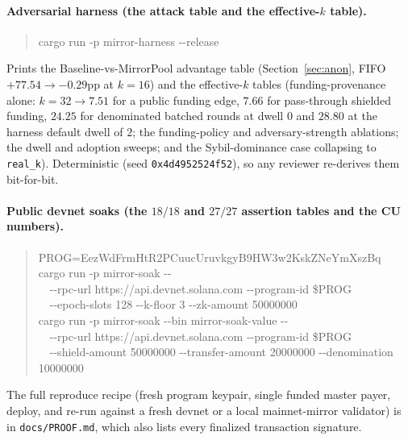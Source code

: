 \documentclass[10pt]{article}
\newcommand{\code}[1]{\texttt{#1}}
\begin{document}
\paragraph{Adversarial harness (the attack table and the effective-$k$ table).}
\begin{quote}\footnotesize\ttfamily
cargo run -p mirror-harness -{}-release
\end{quote}
Prints the Baseline-vs-MirrorPool advantage table (Section~\ref{sec:anon}, FIFO
$+77.54 \to -0.29$pp at $k{=}16$) and the effective-$k$ tables (funding-provenance
alone: $k{=}32 \to 7.51$ for a public funding edge, $7.66$ for pass-through
shielded funding, $24.25$ for denominated batched rounds at dwell $0$ and $28.80$
at the harness default dwell of $2$; the funding-policy and adversary-strength
ablations; the dwell and adoption sweeps; and the Sybil-dominance case collapsing
to \code{real\_k}). Deterministic (seed
\code{0x4d4952524f52}), so any reviewer re-derives them bit-for-bit.

\paragraph{Public devnet soaks (the $18/18$ and $27/27$ assertion tables and the
CU numbers).}
\begin{quote}\footnotesize\ttfamily
PROG=EezWdFrmHtR2PCuucUruvkgyB9HW3w2KskZNeYmXszBq\\
cargo run -p mirror-soak -{}-\ \\
\ \ -{}-rpc-url https://api.devnet.solana.com -{}-program-id \$PROG\ \\
\ \ -{}-epoch-slots 128 -{}-k-floor 3 -{}-zk-amount 50000000\\[0.3em]
cargo run -p mirror-soak -{}-bin mirror-soak-value -{}-\ \\
\ \ -{}-rpc-url https://api.devnet.solana.com -{}-program-id \$PROG\ \\
\ \ -{}-shield-amount 50000000 -{}-transfer-amount 20000000 -{}-denomination 10000000
\end{quote}
The full reproduce recipe (fresh program keypair, single funded master payer,
deploy, and re-run against a fresh devnet or a local mainnet-mirror validator) is
in \code{docs/PROOF.md}, which also lists every finalized transaction signature.
\end{document}
